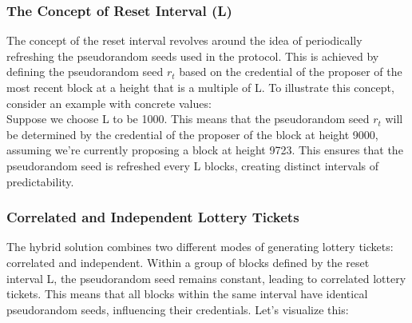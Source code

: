 \subsubsection{The Concept of Reset Interval (L)}
The concept of the reset interval revolves around the idea of periodically refreshing the pseudorandom seeds used in the protocol. This is achieved by defining the pseudorandom seed $r_t$ based on the credential of the proposer of the most recent block at a height that is a multiple of L. To illustrate this concept, consider an example with concrete values:\\

Suppose we choose L to be 1000. This means that the pseudorandom seed $r_t$ will be determined by the credential of the proposer of the block at height 9000, assuming we're currently proposing a block at height 9723. This ensures that the pseudorandom seed is refreshed every L blocks, creating distinct intervals of predictability.

\subsubsection{Correlated and Independent Lottery Tickets}
The hybrid solution combines two different modes of generating lottery tickets: correlated and independent. Within a group of blocks defined by the reset interval L, the pseudorandom seed remains constant, leading to correlated lottery tickets. This means that all blocks within the same interval have identical pseudorandom seeds, influencing their credentials. Let's visualize this:\\

